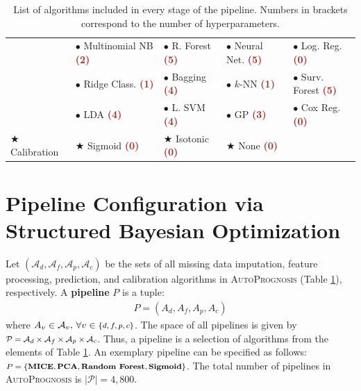 \documentclass [PhD] {uclathes}
\begin{document}
\begin{table}[t]
\begin{tabular}{|l||llll|}
 & {\footnotesize $\bullet$ Multinomial NB {\bf \textcolor{brown}{(2)}}} & {\footnotesize $\bullet$ R. Forest {\bf \textcolor{brown}{(5)}}} & {\footnotesize $\bullet$ Neural Net. {\bf \textcolor{brown}{(5)}}} & {\footnotesize $\bullet$ Log. Reg. {\bf \textcolor{brown}{(0)}}}  \\
 & {\footnotesize $\bullet$ Ridge Class. {\bf \textcolor{brown}{(1)}}} & {\footnotesize $\bullet$ Bagging {\bf \textcolor{brown}{(4)}}} & {\footnotesize $\bullet$ $k$-NN {\bf \textcolor{brown}{(1)}}} & {\footnotesize $\bullet$ Surv. Forest {\bf \textcolor{brown}{(5)}}}   \\
& {\footnotesize $\bullet$ LDA {\bf \textcolor{brown}{(4)}}} & {\footnotesize $\bullet$ L. SVM {\bf \textcolor{brown}{(4)}}} & {\footnotesize $\bullet$ GP {\bf \textcolor{brown}{(3)}}} & {\footnotesize $\bullet$ Cox Reg. {\bf \textcolor{brown}{(0)}}}   \\ 
\hline \hline
{\tiny $\bigstar$} {\footnotesize Calibration} & {\tiny $\bigstar$} {\footnotesize Sigmoid {\bf \textcolor{brown}{(0)}}} & {\tiny $\bigstar$} {\footnotesize Isotonic} {\bf \textcolor{brown}{(0)}} & {\tiny $\bigstar$} {\footnotesize None {\bf \textcolor{brown}{(0)}}} & \\
\hline
\end{tabular}
\caption{List of algorithms included in every stage of the pipeline. Numbers in brackets correspond to the number of hyperparameters.}
\label{ch4Table1}
\end{table}

\section{Pipeline Configuration via Structured Bayesian Optimization}
\label{ch4sec3}
Let $(\mathcal{A}_d,\mathcal{A}_f,\mathcal{A}_p,\mathcal{A}_c)$ be the sets of all missing data imputation, feature processing, prediction, and calibration algorithms in {\footnotesize \textsc{AutoPrognosis}} (Table \ref{ch4Table1}), respectively. A {\bf pipeline} $P$ is a tuple: 
\begin{align}
P = (A_d,A_f,A_p,A_c) \nonumber
\end{align}
where $A_v \in \mathcal{A}_v,\, \forall v \in \mbox{\footnotesize $\{d,f,p,c\}$}$. The space of all pipelines is given by $\mbox{\footnotesize $\mathcal{P} = \mathcal{A}_d \times \mathcal{A}_f \times \mathcal{A}_p \times \mathcal{A}_c$}$. Thus, a pipeline is a selection of algorithms from the elements of Table \ref{ch4Table1}. An exemplary pipeline can be specified as follows: $\mbox{\footnotesize \bf $P = \{\mbox{\footnotesize \bf MICE}, \mbox{\footnotesize \bf PCA}, \mbox{\footnotesize \bf Random Forest},\mbox{\footnotesize \bf Sigmoid}\}$}$. The total number of pipelines in {\footnotesize \textsc{AutoPrognosis}} is $|\mathcal{P}| = 4,800$.
\end{document}
